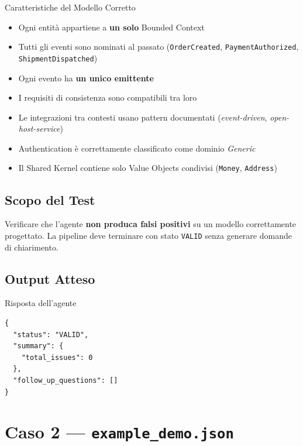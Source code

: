 \documentclass[12pt,a4paper]{report}
\begin{document}
\begin{technicalbox}{Caratteristiche del Modello Corretto}
\begin{itemize}
  \item Ogni entità appartiene a \textbf{un solo} Bounded Context
  \item Tutti gli eventi sono nominati al passato (\texttt{OrderCreated}, \texttt{PaymentAuthorized}, \texttt{ShipmentDispatched})
  \item Ogni evento ha \textbf{un unico emittente}
  \item I requisiti di consistenza sono compatibili tra loro
  \item Le integrazioni tra contesti usano pattern documentati (\textit{event-driven}, \textit{open-host-service})
  \item Authentication è correttamente classificato come dominio \textit{Generic}
  \item Il Shared Kernel contiene solo Value Objects condivisi (\texttt{Money}, \texttt{Address})
\end{itemize}
\end{technicalbox}

\section{Scopo del Test}

Verificare che l'agente \textbf{non produca falsi positivi} su un modello correttamente progettato.
La pipeline deve terminare con stato \texttt{VALID} senza generare domande di chiarimento.

\section{Output Atteso}

\begin{outputbox}{Risposta dell'agente}
\begin{lstlisting}
{
  "status": "VALID",
  "summary": {
    "total_issues": 0
  },
  "follow_up_questions": []
}
\end{lstlisting}
\end{outputbox}

\clearpage

\chapter{Caso 2 --- \texttt{example\_demo.json}}
\end{document}
